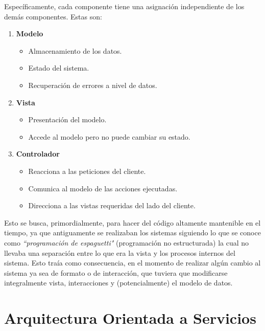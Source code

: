     Específicamente, cada componente tiene una asignación independiente de los demás componentes. Estas son:
    
    \begin{enumerate}
        \item \textbf{Modelo}
            \begin{itemize}
                \item Almacenamiento de los datos.
                \item Estado del sistema.
                \item Recuperación de errores a nivel de datos.
            \end{itemize}
        \item \textbf{Vista}
            \begin{itemize}
                \item Presentación del modelo.
                \item Accede al modelo pero no puede cambiar su estado.
            \end{itemize}
        \item \textbf{Controlador}
            \begin{itemize}
                \item Reacciona a las peticiones del cliente.
                \item Comunica al modelo de las acciones ejecutadas.
                \item Direcciona a las vistas requeridas del lado del cliente.
            \end{itemize}
    \end{enumerate}
    
    Esto se busca, primordialmente, para hacer del código altamente mantenible en el tiempo, ya que antiguamente se realizaban los sistemas siguiendo lo que se conoce como \textit{``programación de espaguetti"} (programación no estructurada) la cual no llevaba una separación entre lo que era la vista y los procesos internos del sistema. Esto traía como consecuencia, en el momento de realizar algún cambio al sistema ya sea de formato o de interacción, que tuviera que modificarse integralmente vista, interacciones y (potencialmente) el modelo de datos.
    
    \section{Arquitectura Orientada a Servicios}
    \label{teorico-soa}
    
